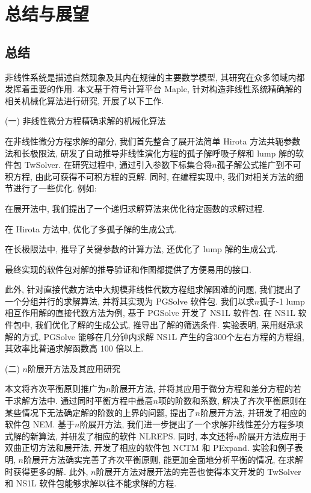 \chapter{总结与展望}\label{ch06}
\section{总结}
非线性系统是描述自然现象及其内在规律的主要数学模型, 其研究在众多领域内都发挥着重要的作用. 本文基于符号计算平台 Maple, 针对构造非线性系统精确解的相关机械化算法进行研究, 开展了以下工作.

(一) 非线性微分方程精确求解的机械化算法

在非线性微分方程求解的部分, 我们首先整合了\Painleve{}展开法\D 简单 Hirota 方法\D 共轭参数法和长极限法, 研发了自动推导非线性演化方程的孤子解\D 呼吸子解和 lump 解的软件包 TwSolver. 在研究过程中, 通过引入参数下标集合将$n$孤子解公式推广到不可积方程, 由此可获得不可积方程的真解. 同时, 在编程实现中, 我们对相关方法的细节进行了一些优化. 例如:
\begin{compactenum}[(1)]
\item 在\Painleve{}展开法中, 我们提出了一个递归求解算法来优化待定函数的求解过程.
\item 在 Hirota 方法中, 优化了多孤子解的生成公式.
\item 在长极限法中, 推导了关键参数的计算方法, 还优化了 lump 解的生成公式.
\item 最终实现的软件包对解的推导\D 验证和作图都提供了方便易用的接口. 
\end{compactenum}

此外, 针对直接代数方法中大规模非线性代数方程组求解困难的问题, 我们提出了一个分组并行的求解算法, 并将其实现为 PGSolve 软件包. 我们以求$n$孤子-1 lump 相互作用解的直接代数方法为例, 基于 PGSolve 开发了 NS1L 软件包. 在 NS1L 软件包中, 我们优化了解的生成公式, 推导出了解的筛选条件. 实验表明, 采用继承求解的方式, PGSolve 能够在几分钟内求解 NS1L 产生的含300个左右方程的方程组, 其效率比普通求解函数高 100 倍以上.  

(二) $n$阶展开方法及其应用研究

本文将齐次平衡原则推广为$n$阶展开方法, 并将其应用于微分方程和差分方程的若干求解方法中. 通过同时平衡方程中最高$n$项的阶数和系数, 解决了齐次平衡原则在某些情况下无法确定解的阶数的上界的问题, 提出了$n$阶展开方法, 并研发了相应的软件包 NEM. 基于$n$阶展开方法, 我们进一步提出了一个求解非线性差分方程多项式解的新算法, 并研发了相应的软件 NLREPS. 同时, 本文还将$n$阶展开方法应用于双曲正切方法和\Painleve{}展开法, 开发了相应的软件包 NCTM 和 PExpand. 实验和例子表明, $n$阶展开方法确实完善了齐次平衡原则, 能更加全面地分析平衡的情况, 在求解时获得更多的解. 此外, $n$阶展开方法对\Painleve{}展开法的完善也使得本文开发的 TwSolver 和 NS1L 软件包能够求解以往不能求解的方程. 

